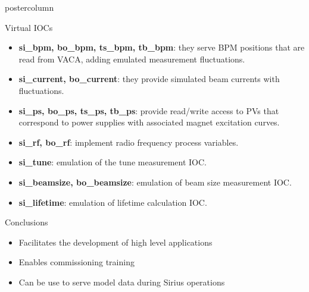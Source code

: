 \documentclass[20pt]{beamer}
\newlength{\columnheight}
\begin{document}
\begin{frame}
\begin{columns}
\begin{column}{.45\textwidth}
\begin{beamercolorbox}[center]{postercolumn}
\begin{minipage}{.98\textwidth}
				\parbox[t][\columnheight]{\textwidth}{ %
				\vspace{1cm}
					\begin{myblock}{Virtual IOCs}
					\begin{itemize}
					\item \textbf{si\_bpm, bo\_bpm, ts\_bpm, tb\_bpm}: they serve BPM positions that are read from VACA, adding emulated measurement fluctuations.
					\item \textbf{si\_current, bo\_current}: they provide simulated beam currents with fluctuations. %
					\item \textbf{si\_ps, bo\_ps, ts\_ps, tb\_ps}: provide read/write access to PVs that correspond to power supplies with associated magnet excitation curves.
					\item \textbf{si\_rf, bo\_rf}: implement radio frequency process variables.
					\item \textbf{si\_tune}: emulation of the tune measurement IOC.
					\item \textbf{si\_beamsize, bo\_beamsize}: emulation of beam size measurement IOC.
					\item \textbf{si\_lifetime}: emulation of lifetime calculation IOC.
					\vspace{1cm}
					\end{itemize}
					
					\end{myblock}
					\vspace{2cm}
					\begin{myblock}{Conclusions}
					
					\begin{itemize}
					\item Facilitates the development of high level applications
					\item Enables commissioning training
					\item Can be use to serve model data during Sirius operations
					\end{itemize}
					

\end{myblock}}
\end{minipage}
\end{beamercolorbox}
\end{column}
\end{columns}
\end{frame}
\end{document}
